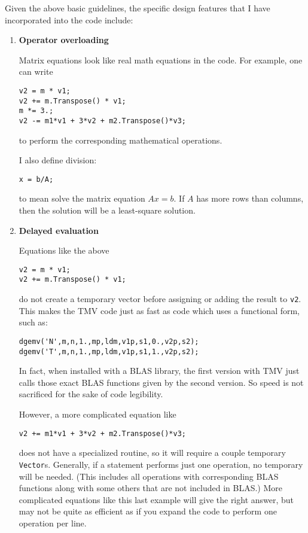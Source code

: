 \documentclass[twoside,letterpaper,11pt]{article}
\renewcommand{\tt}[1]{{\texttt {#1}}}
\begin{document}
Given the above basic guidelines, the specific design features that I 
have incorporated into the code include:

\begin{enumerate}
\item
\textbf{Operator overloading}

Matrix equations look like real math equations in the code. 
For example, one can write 
\begin{verbatim}
v2 = m * v1;
v2 += m.Transpose() * v1;
m *= 3.;
v2 -= m1*v1 + 3*v2 + m2.Transpose()*v3;
\end{verbatim} 
to perform the corresponding mathematical operations.

I also define division:
\begin{verbatim}
x = b/A;
\end{verbatim}
to mean solve the matrix equation $A x = b$.  If $A$ has more rows than columns,
then the solution will be a least-square solution.

\item
\textbf{Delayed evaluation}

Equations like the above 
\begin{verbatim}
v2 = m * v1;
v2 += m.Transpose() * v1;
\end{verbatim}
do not create a temporary vector before assigning or adding the result to \tt{v2}.  This makes 
the TMV code just as fast as code which uses a functional form, such as:
\begin{verbatim}
dgemv('N',m,n,1.,mp,ldm,v1p,s1,0.,v2p,s2);
dgemv('T',m,n,1.,mp,ldm,v1p,s1,1.,v2p,s2);
\end{verbatim}
In fact, when installed with a BLAS library, the first version with TMV just calls those exact 
BLAS functions given by the second version.  
So speed is not sacrificed for the sake of code legibility.

However, a more complicated equation like
\begin{verbatim}
v2 += m1*v1 + 3*v2 + m2.Transpose()*v3;
\end{verbatim}
does not have a specialized routine, 
so it will require a couple temporary \tt{Vector}s.
Generally, if a statement performs just one operation, no temporary will be needed.  
(This includes all operations with corresponding BLAS functions along with some others
that are not included in BLAS.)
More complicated equations like this last example will give the right answer, 
but may not be quite as efficient as if you expand
the code to perform one operation per line.


\end{enumerate}
\end{document}
